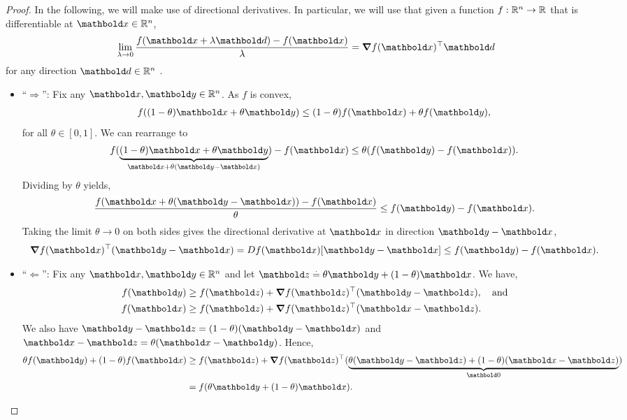 \begin{proof}
  In the following, we will make use of directional derivatives.
  In particular, we will use that given a function $f : \mathbb{R}^n \to \mathbb{R}$ that is differentiable at $\vx \in \R^n$, \begin{align}
    \lim_{\lambda \to 0} \frac{f(\vx + \lambda\vd) - f(\vx)}{\lambda} = \transpose{\grad f(\vx)} \vd
  \end{align} for any direction $\vd \in \R^n$ .

  \vspace{5pt}\begin{itemize}
    \item ``$\Rightarrow$'':
    Fix any $\vx, \vy \in \R^n$.
    As $f$ is convex, \begin{align*}
      f((1-\theta)\vx + \theta\vy) \leq (1-\theta)f(\vx) + \theta f(\vy),
    \end{align*} for all $\theta \in [0,1]$.
    We can rearrange to \begin{align*}
      f(\underbrace{(1-\theta)\vx + \theta\vy}_{\vx + \theta(\vy - \vx)}) - f(\vx) \leq \theta(f(\vy) - f(\vx)).
    \end{align*}
    Dividing by $\theta$ yields, \begin{align*}
      \frac{f(\vx + \theta(\vy - \vx)) - f(\vx)}{\theta} \leq f(\vy) - f(\vx).
    \end{align*}
    Taking the limit $\theta \to 0$ on both sides gives the directional derivative at $\vx$ in direction $\vy - \vx$, \begin{align*}
      \transpose{\grad f(\vx)}(\vy - \vx) = D f(\vx)[\vy - \vx] \leq f(\vy) - f(\vx).
    \end{align*}

    \item ``$\Leftarrow$'':
    Fix any $\vx, \vy \in \R^n$ and let $\vz \defeq \theta\vy + (1-\theta)\vx$.
    We have, \begin{align*}
      f(\vy) &\geq f(\vz) + \transpose{\grad f(\vz)}(\vy - \vz), \quad\text{and} \\
      f(\vx) &\geq f(\vz) + \transpose{\grad f(\vz)}(\vx - \vz).
    \end{align*}
    We also have $\vy - \vz = (1-\theta)(\vy-\vx)$ and $\vx - \vz = \theta(\vx - \vy)$.
    Hence, \begin{align*}
      \theta f(\vy) + (1-\theta) f(\vx) &\geq f(\vz) + \transpose{\grad f(\vz)}(\underbrace{\theta(\vy - \vz) + (1-\theta)(\vx - \vz)}_{\vzero}) \\
      &= f(\theta\vy + (1-\theta)\vx). \qedhere
    \end{align*}
  \end{itemize}
\end{proof}

